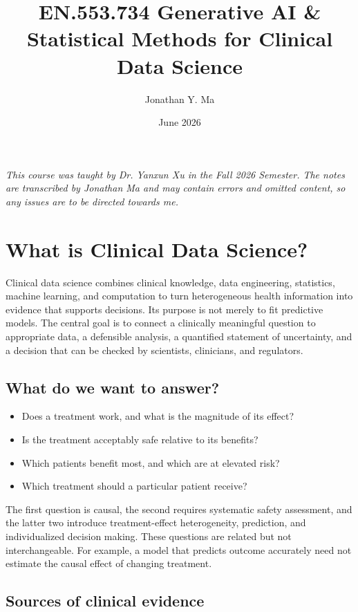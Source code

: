 \documentclass[12pt,oneside]{book}
\title{EN.553.734 Generative AI \& Statistical Methods for Clinical Data Science}
\author{Jonathan Y. Ma}
\date{June 2026}
\numberwithin{equation}{section}
\theoremstyle{definition}
\theoremstyle{plain}
\theoremstyle{remark}
\begin{document}
\maketitle

\noindent \emph{This course was taught by Dr. Yanxun Xu in the Fall 2026 Semester. The notes are transcribed by Jonathan Ma and may contain errors and omitted content, so any issues are to be directed towards me.}

\tableofcontents

\section{What is Clinical Data Science?}
Clinical data science combines clinical knowledge, data engineering, statistics,
machine learning, and computation to turn heterogeneous health information into
evidence that supports decisions.  Its purpose is not merely to fit predictive
models.  The central goal is to connect a clinically meaningful question to
appropriate data, a defensible analysis, a quantified statement of uncertainty,
and a decision that can be checked by scientists, clinicians, and regulators.

\subsection{What do we want to answer?}
\begin{itemize}
    \item Does a treatment work, and what is the magnitude of its effect?
    \item Is the treatment acceptably safe relative to its benefits?
    \item Which patients benefit most, and which are at elevated risk?
    \item Which treatment should a particular patient receive?
\end{itemize}
The first question is causal, the second requires systematic safety assessment,
and the latter two introduce treatment-effect heterogeneity, prediction, and
individualized decision making.  These questions are related but not
interchangeable.  For example, a model that predicts outcome accurately need
not estimate the causal effect of changing treatment.

\subsection{Sources of clinical evidence}
\end{document}
